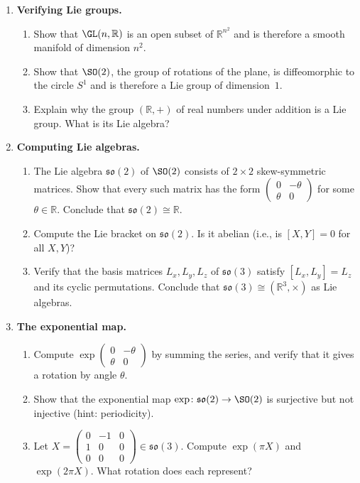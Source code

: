 \begin{enumerate}
    \item \textbf{Verifying Lie groups.}
    \begin{enumerate}
        \item Show that $\GL(n,\mathbb{R})$ is an open subset of $\mathbb{R}^{n^2}$ and is therefore a smooth manifold of dimension $n^2$.
        \item Show that $\SO(2)$, the group of rotations of the plane, is diffeomorphic to the circle $S^1$ and is therefore a Lie group of dimension~$1$.
        \item Explain why the group $(\mathbb{R}, +)$ of real numbers under addition is a Lie group. What is its Lie algebra?
    \end{enumerate}

    \item \textbf{Computing Lie algebras.}
    \begin{enumerate}
        \item The Lie algebra $\mathfrak{so}(2)$ of $\SO(2)$ consists of $2 \times 2$ skew-symmetric matrices. Show that every such matrix has the form $\begin{pmatrix} 0 & -\theta \\ \theta & 0 \end{pmatrix}$ for some $\theta \in \mathbb{R}$. Conclude that $\mathfrak{so}(2) \cong \mathbb{R}$.
        \item Compute the Lie bracket on $\mathfrak{so}(2)$. Is it abelian (i.e., is $[X,Y] = 0$ for all $X, Y$)?
        \item Verify that the basis matrices $L_x, L_y, L_z$ of $\mathfrak{so}(3)$ satisfy $[L_x, L_y] = L_z$ and its cyclic permutations. Conclude that $\mathfrak{so}(3) \cong (\mathbb{R}^3, \times)$ as Lie algebras.
    \end{enumerate}

    \item \textbf{The exponential map.}
    \begin{enumerate}
        \item Compute $\exp\!\begin{pmatrix} 0 & -\theta \\ \theta & 0 \end{pmatrix}$ by summing the series, and verify that it gives a rotation by angle $\theta$.
        \item Show that the exponential map $\exp \colon \mathfrak{so}(2) \to \SO(2)$ is surjective but not injective (hint: periodicity).
        \item Let $X = \begin{pmatrix} 0 & -1 & 0 \\ 1 & 0 & 0 \\ 0 & 0 & 0 \end{pmatrix} \in \mathfrak{so}(3)$. Compute $\exp(\pi X)$ and $\exp(2\pi X)$. What rotation does each represent?
    \end{enumerate}


\end{enumerate}
